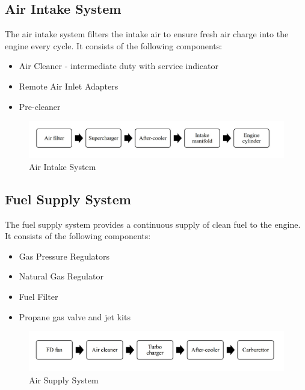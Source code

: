 \documentclass[12pt]{article}
\begin{document}
          \vspace*{0.6cm}
          \subsection*{Air Intake System}
          The air intake system filters the intake air to ensure fresh air charge into the engine every cycle. It consists of the following components:
          \begin{itemize}
            \item Air Cleaner - intermediate duty with service indicator
            \item Remote Air Inlet Adapters 
            \item Pre-cleaner 
          \end{itemize}

          \begin{figure}[H]
            \begin{center}
              \includegraphics[width=0.98\linewidth]{img/intake_system.jpeg}
              \caption{Air Intake System}
            \end{center}
          \end{figure}

          \subsection*{Fuel Supply System}
          The fuel supply system provides a continuous supply of clean fuel to the engine. It consists of the following components:
          \begin{itemize}
            \item Gas Pressure Regulators 
            \item Natural Gas Regulator 
            \item Fuel Filter 
            \item Propane gas valve and jet kits 
          \end{itemize}
          \begin{figure}[H]
            \begin{center}
              \includegraphics[width=0.98\linewidth]{img/air_supply.jpeg}
              \caption{Air Supply System}
            \end{center}
          \end{figure}
          
\end{document}
